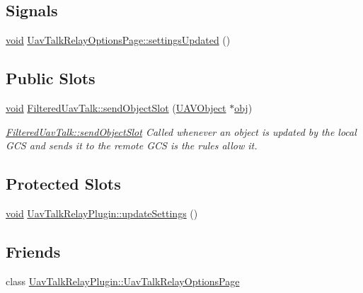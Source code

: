 \subsection*{Signals}
\begin{DoxyCompactItemize}
\item 
\hyperlink{group___u_a_v_objects_plugin_ga444cf2ff3f0ecbe028adce838d373f5c}{void} \hyperlink{group___u_a_v_talk_gace88a60fb10cfb6c3994f0a3a8883aa3}{Uav\-Talk\-Relay\-Options\-Page\-::settings\-Updated} ()
\end{DoxyCompactItemize}
\subsection*{Public Slots}
\begin{DoxyCompactItemize}
\item 
\hyperlink{group___u_a_v_objects_plugin_ga444cf2ff3f0ecbe028adce838d373f5c}{void} \hyperlink{group___u_a_v_talk_ga41ca9188bbbc0be7e458f94ef49117df}{Filtered\-Uav\-Talk\-::send\-Object\-Slot} (\hyperlink{class_u_a_v_object}{U\-A\-V\-Object} $\ast$\hyperlink{glext_8h_a0c0d4701a6c89f4f7f0640715d27ab26}{obj})
\begin{DoxyCompactList}\small\item\em \hyperlink{group___u_a_v_talk_ga41ca9188bbbc0be7e458f94ef49117df}{Filtered\-Uav\-Talk\-::send\-Object\-Slot} Called whenever an object is updated by the local G\-C\-S and sends it to the remote G\-C\-S is the rules allow it. \end{DoxyCompactList}\end{DoxyCompactItemize}
\subsection*{Protected Slots}
\begin{DoxyCompactItemize}
\item 
\hyperlink{group___u_a_v_objects_plugin_ga444cf2ff3f0ecbe028adce838d373f5c}{void} \hyperlink{group___u_a_v_talk_gac6522ac462e3ef789bccecdf33e38779}{Uav\-Talk\-Relay\-Plugin\-::update\-Settings} ()
\end{DoxyCompactItemize}
\subsection*{Friends}
\begin{DoxyCompactItemize}
\item 
class \hyperlink{group___u_a_v_talk_gaf20a0868107dbd85408f5bcba4e98063}{Uav\-Talk\-Relay\-Plugin\-::\-Uav\-Talk\-Relay\-Options\-Page}
\end{DoxyCompactItemize}


